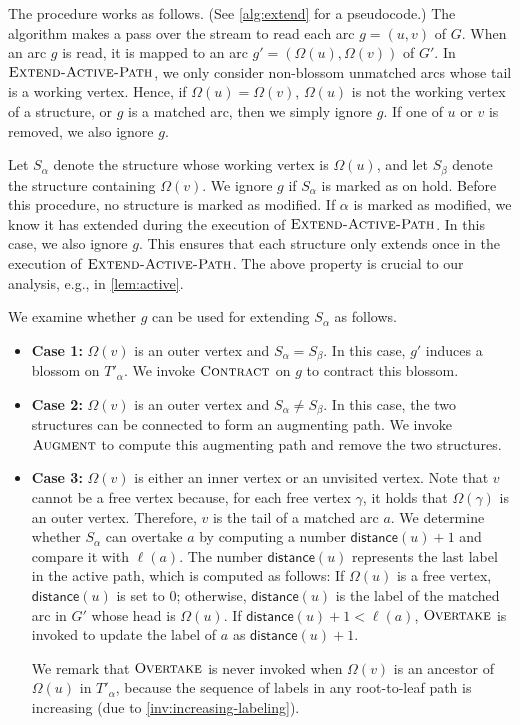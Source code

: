 \documentclass{article}
\newcommand{\alp}{\alpha}
\newcommand{\Omg}{\Omega}
\newcommand{\lab}{\mathsf{distance}}
\newcommand{\algExtend}{\textsc{Extend-Active-Path}\xspace}
\newcommand{\algOvertake}{\textsc{Overtake}\xspace}
\newcommand{\algAugment}{\textsc{Augment}\xspace}
\newcommand{\algContract}{\textsc{Contract}\xspace}
\begin{document}
The procedure works as follows.
(See \cref{alg:extend} for a pseudocode.)
The algorithm makes a pass over the stream to read each arc $g = (u, v)$ of $G$.
When an arc $g$ is read, it is mapped to an arc $g' = (\Omg(u), \Omg(v))$ of $G'$.
In $\algExtend$, we only consider non-blossom unmatched arcs whose tail is a working vertex.
Hence, if $\Omg(u) = \Omg(v)$, $\Omg(u)$ is not the working vertex of a structure, or $g$ is a matched arc, then we simply ignore $g$.
If one of $u$ or $v$ is removed, we also ignore $g$.

Let $S_\alp$ denote the structure whose working vertex is $\Omg(u)$, and let $S_\beta$ denote the structure containing $\Omg(v)$.
We ignore $g$ if $S_\alp$ is marked as on hold.
Before this procedure, no structure is marked as modified.
If $\alp$ is marked as modified, we know it has extended during the execution of $\algExtend$.
In this case, we also ignore $g$.
This ensures that each structure only extends once in the execution of $\algExtend$.
The above property is crucial to our analysis, e.g., in \cref{lem:active}.

We examine whether $g$ can be used for extending $S_\alp$ as follows.
\begin{itemize}
    \item[] \textbf{Case 1:} $\Omg(v)$ is an outer vertex and $S_\alp = S_\beta$. In this case, $g'$ induces a blossom on $T'_\alp$. We invoke $\algContract$ on $g$ to contract this blossom.
    \item[] \textbf{Case 2:} $\Omg(v)$ is an outer vertex and $S_\alp \neq S_\beta$. In this case, the two structures can be connected to form an augmenting path. We invoke $\algAugment$ to compute this augmenting path and remove the two structures.
    \item[] \textbf{Case 3:} $\Omg(v)$ is either an inner vertex or an unvisited vertex.
    Note that $v$ cannot be a free vertex because, for each free vertex $\gamma$, it holds that $\Omg(\gamma)$ is an outer vertex.
    Therefore, $v$ is the tail of a matched arc $a$.
    We determine whether $S_\alp$ can overtake $a$ by computing a number $\lab(u) + 1$ and compare it with $\ell(a)$.
    The number $\lab(u)$ represents the last label in the active path, which is computed as follows:
    If $\Omg(u)$ is a free vertex, $\lab(u)$ is set to $0$;
    otherwise, $\lab(u)$ is the label of the matched arc in $G'$ whose head is $\Omg(u)$.
    If $\lab(u) + 1 < \ell(a)$, $\algOvertake$ is invoked to update the label of $a$ as $\lab(u) + 1$.
    
    We remark that $\algOvertake$ is never invoked when $\Omg(v)$ is an ancestor of $\Omg(u)$ in $T'_\alp$, because the sequence of labels in any root-to-leaf path is increasing (due to \cref{inv:increasing-labeling}).


\end{itemize}
\end{document}
